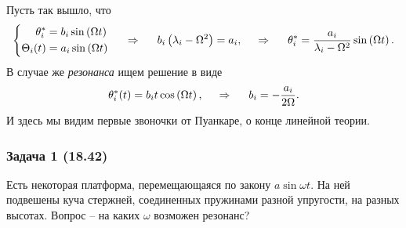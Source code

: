 Пусть так вышло, что 
\begin{equation*}
    \left\{\begin{aligned}
        \theta_i^* &= b_i \sin \left(\Omega t\right) \\
        \Theta_i (t) &= a_i \sin \left(\Omega t\right)
    \end{aligned}\right.
    \hspace{0.5cm} \Rightarrow \hspace{0.5cm}
    b_i \left(
        \lambda_i - \Omega^2
    \right) = a_i,
    \hspace{0.5cm} \Rightarrow \hspace{0.5cm}
    \theta_i^* = \frac{a_i}{\lambda_i - \Omega^2} \sin \left(\Omega t\right).
\end{equation*}
В случае же \textit{резонанса} ищем решение в виде
\begin{equation*}
    \theta_i^* (t) = b_i t \cos\left(\Omega t\right),
    \hspace{0.5cm} \Rightarrow \hspace{0.5cm}
    b_i = -\frac{a_i}{2 \Omega}.
\end{equation*}
И здесь мы видим первые звоночки от Пуанкаре, о конце линейной теории.



\subsubsection*{Задача 1 (18.42)}

Есть некоторая платформа, перемещающаяся по закону $a \sin \omega t$. На ней подвешены куча стержней, соединенных пружинами разной упругости, на разных высотах. Вопрос -- на каких $\omega$ возможен резонанс?

